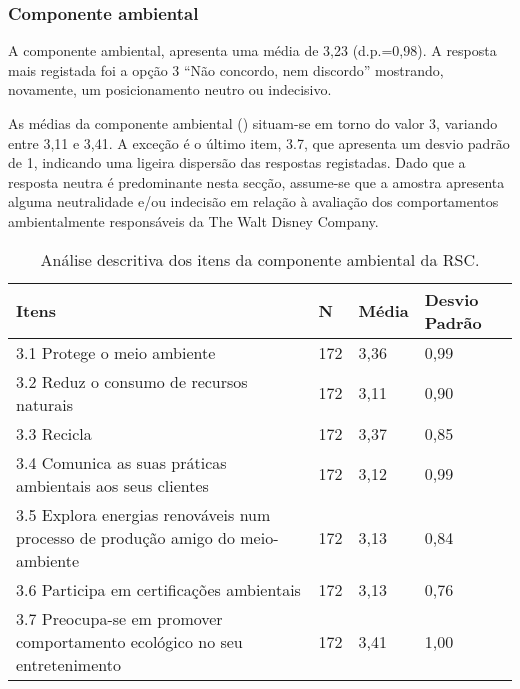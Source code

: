 \documentclass[portuguese]{textolivre}
\begin{document}
\subsubsection{Componente ambiental}\label{sec-listas}
A componente ambiental, apresenta uma média de 3,23 (d.p.=0,98). A resposta mais registada foi a opção 3 “Não concordo, nem discordo” mostrando, novamente, um posicionamento neutro ou indecisivo. 

As médias da componente ambiental () situam-se em torno do valor 3, variando entre 3,11 e 3,41. A exceção é o último item, 3.7, que apresenta um desvio padrão de 1, indicando uma ligeira dispersão das respostas registadas. Dado que a resposta neutra é predominante nesta secção, assume-se que a amostra apresenta alguma neutralidade e/ou indecisão em relação à avaliação dos comportamentos ambientalmente responsáveis da The Walt Disney Company. 

\begin{table}[h!]
\centering
\begin{threeparttable}
\caption{Análise descritiva dos itens da componente ambiental da RSC.}
\label{tab02}
\begin{tabular}{p{8cm} lll}
\toprule
 Itens & N & \multicolumn{1}{p{1cm}}{Média} & \multicolumn{1}{p{1.2cm}}{Desvio Padrão} \\
\midrule
3.1 Protege o meio ambiente & 172 & 3,36 & 0,99 \\
3.2 Reduz o consumo de recursos naturais & 172 & 3,11 & 0,90 \\
3.3 Recicla & 172 & 3,37 & 0,85 \\
3.4 Comunica as suas práticas ambientais aos seus clientes & 172 & 3,12 & 0,99 \\
3.5 Explora energias renováveis num processo de produção amigo do meio-ambiente & 172 & 3,13 & 0,84 \\
3.6 Participa em certificações ambientais & 172 & 3,13 & 0,76 \\
3.7 Preocupa-se em promover comportamento ecológico no seu entretenimento  &
172 & 3,41 & 1,00 \\
\bottomrule
\end{tabular}
\end{threeparttable}
\end{table}
\end{document}
